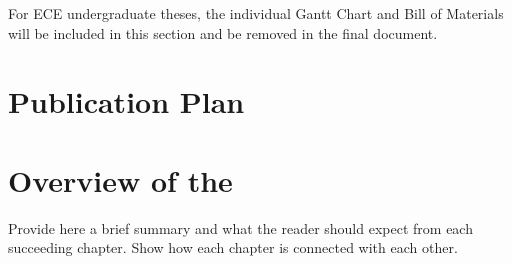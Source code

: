 For ECE undergraduate theses, the individual Gantt Chart and Bill of Materials will be included in this section and be removed in the final document.

\graytx{\blindtext}

\ifPhD
\section{Publication Plan}
\graytx{\blindtext}
\fi

\fi


\section{Overview of the \documentType}

Provide here a brief summary and what the reader should expect from each succeeding chapter.  Show how each chapter is connected with each other.
